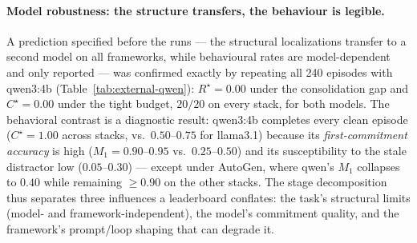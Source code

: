 \documentclass{article}
\begin{document}
\paragraph{Model robustness: the structure transfers, the behaviour is
legible.} A prediction specified before the runs --- the structural
localizations transfer to a second model on all frameworks, while
behavioural rates are model-dependent and only reported --- was
confirmed exactly by repeating all 240 episodes with qwen3:4b
(Table~\ref{tab:external-qwen}): $R^\star{=}0.00$ under the
consolidation gap and $C^\star{=}0.00$ under the tight budget, $20/20$
on every stack, for both models. The behavioral contrast is a
diagnostic result: qwen3:4b completes every clean episode
($C^\star{=}1.00$ across stacks, vs.\ $0.50$--$0.75$ for llama3.1)
because its \emph{first-commitment accuracy} is high
($M_1{=}0.90$--$0.95$ vs.\ $0.25$--$0.50$) and its susceptibility to
the stale distractor low ($0.05$--$0.30$) --- except under AutoGen,
where qwen's $M_1$ collapses to $0.40$ while remaining $\ge 0.90$ on
the other stacks. The stage decomposition thus separates three
influences a leaderboard conflates: the task's structural limits
(model- and framework-independent), the model's commitment quality,
and the framework's prompt/loop shaping that can degrade it.
\end{document}
